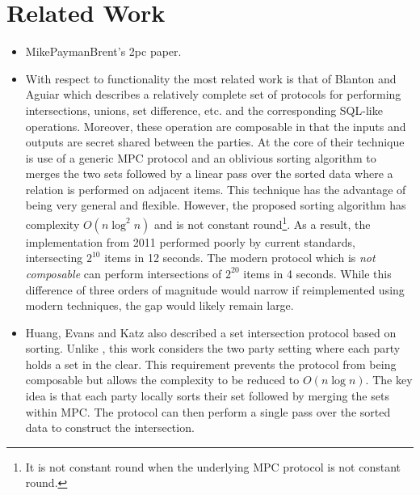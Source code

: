 \section{Related Work}

\begin{itemize}
	\item MikePaymanBrent's 2pc paper.

\item With respect to functionality the most related work is that of Blanton and Aguiar\cite{BA11} which describes a relatively complete set of protocols for performing intersections, unions, set difference, etc. and the corresponding SQL-like operations. Moreover, these operation are composable in that the inputs and outputs are secret shared between the parties. At the core of their technique is use of a generic MPC protocol and an oblivious sorting algorithm to merges the two sets followed by a linear pass over the sorted data where a relation is performed on adjacent items. This technique has the advantage of being very general and flexible. However, the proposed sorting algorithm has complexity $O(n \log^2 n)$ and is not constant round\footnote{It is not constant round when the underlying MPC protocol is not constant round.}. As a result, the implementation from 2011 performed poorly by current standards, intersecting $2^{10}$ items in 12 seconds. The modern protocol \cite{kkrt} which is \emph{not composable} can perform intersections of $2^{20}$ items in 4 seconds. While this difference of three orders of magnitude would narrow if reimplemented using modern techniques, the gap would likely remain large.

\item  Huang, Evans and Katz\cite{HEK12} also described a set intersection protocol based on sorting. Unlike \cite{BA11}, this work considers the two party setting where each party holds a set in the clear. This requirement prevents the protocol from being composable but allows the complexity to be reduced to $O(n\log n)$. The key idea is that each party locally sorts their set followed by merging the sets within MPC. The protocol can then perform a single pass over the sorted data to construct the intersection. 


\end{itemize}

